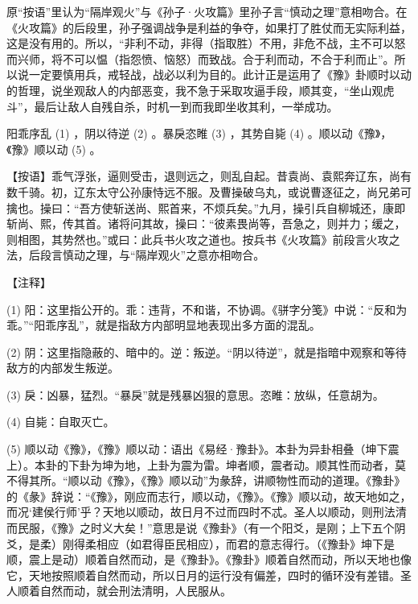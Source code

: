 \documentclass[12pt,UTF8]{ctexbook}
\begin{document}
原“按语”里认为“隔岸观火”与《孙子·火攻篇》里孙子言“慎动之理”意相吻合。在《火攻篇》的后段里，孙子强调战争是利益的争夺，如果打了胜仗而无实际利益，这是没有用的。所以，“非利不动，非得（指取胜）不用，非危不战，主不可以怒而兴师，将不可以愠（指怨愤、恼怒）而致战。合于利而动，不合于利而止”。所以说一定要慎用兵，戒轻战，战必以利为目的。此计正是运用了《豫》卦顺时以动的哲理，说坐观敌人的内部恶变，我不急于采取攻逼手段，顺其变，“坐山观虎斗”，最后让敌人自残自杀，时机一到而我即坐收其利，一举成功。





阳乖序乱 (1) ，阴以待逆 (2) 。暴戾恣睢 (3) ，其势自毙 (4) 。顺以动《豫》，《豫》顺以动 (5) 。

【按语】乖气浮张，逼则受击，退则远之，则乱自起。昔袁尚、袁熙奔辽东，尚有数千骑。初，辽东太守公孙康恃远不服。及曹操破乌丸，或说曹逐征之，尚兄弟可擒也。操曰：“吾方使斩送尚、熙首来，不烦兵矣。”九月，操引兵自柳城还，康即斩尚、熙，传其首。诸将问其故，操曰：“彼素畏尚等，吾急之，则并力；缓之，则相图，其势然也。”或曰：此兵书火攻之道也。按兵书《火攻篇》前段言火攻之法，后段言慎动之理，与“隔岸观火”之意亦相吻合。





【注释】


(1) 阳：这里指公开的。乖：违背，不和谐，不协调。《骈字分笺》中说：“反和为乖。”“阳乖序乱”，就是指敌方内部明显地表现出多方面的混乱。

(2) 阴：这里指隐蔽的、暗中的。逆：叛逆。“阴以待逆”，就是指暗中观察和等待敌方的内部发生叛逆。

(3) 戾：凶暴，猛烈。“暴戾”就是残暴凶狠的意思。恣睢：放纵，任意胡为。

(4) 自毙：自取灭亡。

(5) 顺以动《豫》，《豫》顺以动：语出《易经·豫卦》。本卦为异卦相叠（坤下震上）。本卦的下卦为坤为地，上卦为震为雷。坤者顺，震者动。顺其性而动者，莫不得其所。“顺以动《豫》，《豫》顺以动”为彖辞，讲顺物性而动的道理。《豫卦》的《彖》辞说：“《豫》，刚应而志行，顺以动，《豫》。《豫》顺以动，故天地如之，而况‘建侯行师’乎？天地以顺动，故日月不过而四时不忒。圣人以顺动，则刑法清而民服，《豫》之时义大矣！”意思是说《豫卦》（有一个阳爻，是刚；上下五个阴爻，是柔）刚得柔相应（如君得臣民相应），而君的意志得行。（《豫卦》坤下是顺，震上是动）顺着自然而动，是《豫卦》。《豫卦》顺着自然而动，所以天地也像它，天地按照顺着自然而动，所以日月的运行没有偏差，四时的循环没有差错。圣人顺着自然而动，就会刑法清明，人民服从。
\end{document}
